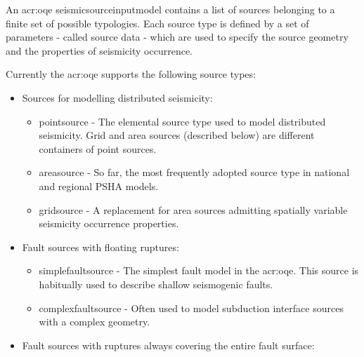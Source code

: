 An \glsdesc{acr:oqe} \gls{seismicsourceinputmodel} contains a list of sources
belonging to a finite set of possible typologies. Each source type is defined
by a set of parameters - called source data - which are used to specify the
source geometry and the properties of seismicity occurrence.

Currently the \glsdesc{acr:oqe} supports the following source types:

\begin{itemize}

    \item Sources for modelling distributed seismicity:

    \begin{itemize}

        \item \Gls{pointsource} - The elemental source type used to model
        distributed seismicity. Grid and area sources (described below) are
        different containers of point sources.

        \item \Gls{areasource} - So far, the most frequently adopted source
        type in national and regional PSHA models.

        \item \Gls{gridsource} - A replacement for area sources admitting
        spatially variable seismicity occurrence properties.

    \end{itemize}

    \item Fault sources with floating ruptures:

    \begin{itemize}

        \item \Gls{simplefaultsource} - The simplest fault model in the
        \glsdesc{acr:oqe}. This source is habitually used to describe shallow
        seismogenic faults.

        \item \Gls{complexfaultsource} - Often used to model subduction
        interface sources with a complex geometry.

    \end{itemize}

    \item Fault sources with ruptures always covering the entire fault surface:

    \begin{itemize}


\end{itemize}
\end{itemize}
